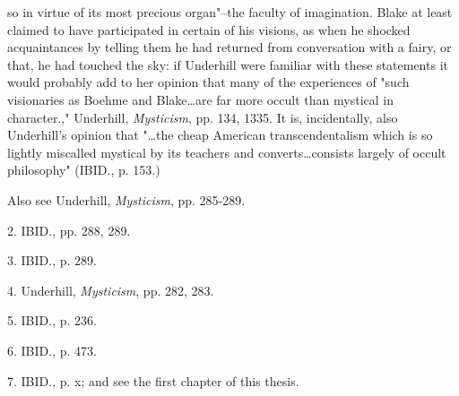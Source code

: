 so in virtue of its most precious organ"--the faculty of imagination. Blake at least claimed to have
participated in certain of his visions, as when he shocked acquaintances by telling them he had returned from
conversation with a fairy, or that, he had touched the sky: if Underhill were familiar with these
statements it would probably add to her opinion that many of the experiences of "such visionaries as Boehme and 
Blake\dots are far more occult than mystical in character.," Underhill, \textit{Mysticism}, pp. 134, 1335. It is, incidentally, also Underhill's
opinion that "\dots the cheap American transcendentalism which is so lightly miscalled mystical by its 
teachers and converts\dots consists largely of occult philosophy" (IBID., p. 153.)\par
\noindent Also see Underhill, \textit{Mysticism}, pp. 285-289.\par
2. IBID., pp. 288, 289.\par
3. IBID., p. 289.\par
4. Underhill, \textit{Mysticism}, pp. 282, 283.\par
5. IBID., p. 236.\par
6. IBID., p. 473.\par
7. IBID., p. x; and see the first chapter of this thesis.\par 

\newpage

